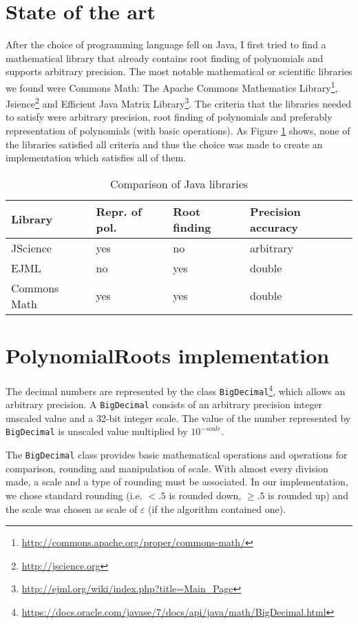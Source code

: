 \documentclass[
  digital, %
  notable,   %
  nolof,     %
  nolot,     %
	final, %
]{fithesis3}
\begin{document}
\section{State of the art}
After the choice of programming language fell on Java, I first tried to find a mathematical library that already contains root finding of polynomials and supports arbitrary precision. The most notable mathematical or scientific libraries we found were Commons Math: The Apache Commons Mathematics Library\footnote{\url{http://commons.apache.org/proper/commons-math/}}, Jsience\footnote{\url{http://jscience.org}} and Efficient Java Matrix Library\footnote{\url{http://ejml.org/wiki/index.php?title=Main_Page}}. The criteria that the libraries needed to satisfy were arbitrary precision, root finding of polynomials and preferably representation of polynomials (with basic operations). As Figure \ref{tab:sota} shows, none of the libraries satisfied all criteria and thus the choice was made to create an implementation which satisfies all of them.

\FloatBarrier
\begin{table}[H]
  \begin{tabular*}{\textwidth}{llll}
    \toprule
    Library & Repr. of pol. & Root finding & Precision accuracy\\
    \midrule
				JScience & yes & no & arbitrary \\
				EJML & no & yes & double \\
				Commons Math & yes & yes & double \\
    \bottomrule
  \end{tabular*}
  \caption{Comparison of Java libraries}
  \label{tab:sota}
\end{table}

\section{PolynomialRoots implementation}
The decimal numbers are represented by the class \texttt{BigDecimal}\footnote{\url{https://docs.oracle.com/javase/7/docs/api/java/math/BigDecimal.html}}, which allows an arbitrary precision. A \texttt{BigDecimal} consists of an arbitrary precision integer unscaled value and a 32-bit integer scale. The value of the number represented by \texttt{BigDecimal} is unscaled value multiplied by $10^{-scale}$.

The \texttt{BigDecimal} class provides basic mathematical operations and operations for comparison, rounding and manipulation of scale. With almost every division made, a scale and a type of rounding must be associated. In our implementation, we chose standard rounding (i.e. $<.5$ is rounded down, $\geq.5$ is rounded up) and the scale was chosen as scale of $\varepsilon$ (if the algorithm contained one).
\end{document}
